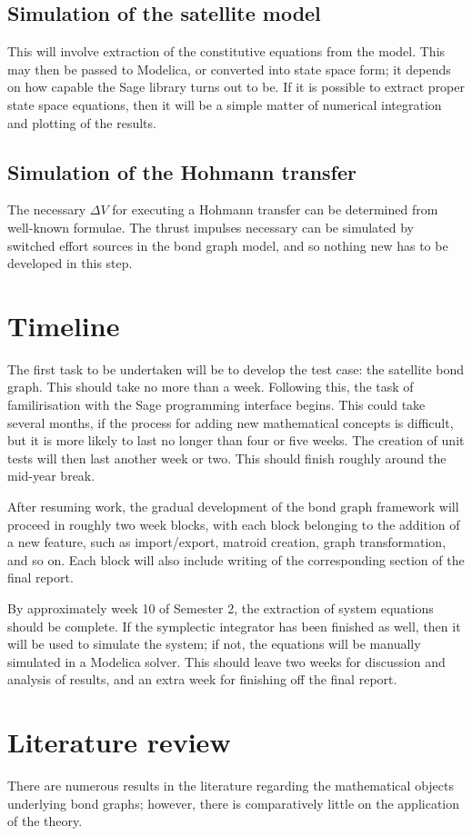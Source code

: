 \documentclass[utf8,a4paper,12pt]{report}
\begin{document}
\section{Simulation of the satellite model}
This will involve extraction of the constitutive equations from the model. This may then be passed to Modelica, or converted into state space form; it depends on how capable the Sage library turns out to be. If it is possible to extract proper state space equations, then it will be a simple matter of numerical integration and plotting of the results.

\section{Simulation of the Hohmann transfer}
The necessary $\Delta V$ for executing a Hohmann transfer can be determined from well-known formulae. The thrust impulses necessary can be simulated by switched effort sources in the bond graph model, and so nothing new has to be developed in this step.

\chapter{Timeline}
The first task to be undertaken will be to develop the test case: the satellite bond graph. This should take no more than a week. Following this, the task of familirisation with the Sage programming interface begins. This could take several months, if the process for adding new mathematical concepts is difficult, but it is more likely to last no longer than four or five weeks. The creation of unit tests will then last another week or two. This should finish roughly around the mid-year break. 

After resuming work, the gradual development of the bond graph framework will proceed in roughly two week blocks, with each block belonging to the addition of a new feature, such as import/export, matroid creation, graph transformation, and so on. Each block will also include writing of the corresponding section of the final report.

By approximately week 10 of Semester 2, the extraction of system equations should be complete. If the symplectic integrator has been finished as well, then it will be used to simulate the system; if not, the equations will be manually simulated in a Modelica solver. This should leave two weeks for discussion and analysis of results, and an extra week for finishing off the final report.
\chapter{Literature review}
There are numerous results in the literature regarding the mathematical objects underlying bond graphs; however, there is comparatively little on the application of the theory.
\end{document}
